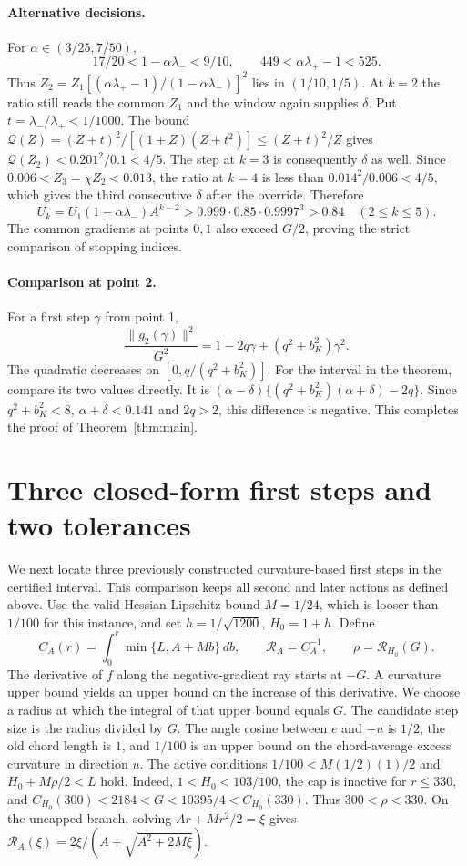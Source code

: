 \documentclass[11pt]{article}
\newcommand{\norm}[1]{\lVert#1\rVert}
\begin{document}
\paragraph{Alternative decisions.}
For \(\alpha\in(3/25,7/50)\),
\[
 17/20<1-\alpha\lambda_-<9/10,\qquad
 449<\alpha\lambda_+-1<525 .
\]
Thus \(Z_2=Z_1[(\alpha\lambda_+-1)/(1-\alpha\lambda_-)]^2\)
lies in \((1/10,1/5)\). At \(k=2\) the ratio still reads the
common \(Z_1\) and the window again supplies \(\delta\).
Put \(t=\lambda_-/\lambda_+<1/1000\). The bound
\(\mathcal Q(Z)=(Z+t)^2/[(1+Z)(Z+t^2)]\le (Z+t)^2/Z\)
gives \(\mathcal Q(Z_2)<0.201^2/0.1<4/5\).
The step at \(k=3\) is consequently \(\delta\) as well.
Since \(0.006<Z_3=\chi Z_2<0.013\), the ratio at \(k=4\) is
less than \(0.014^2/0.006<4/5\), which gives the third
consecutive \(\delta\) after the override. Therefore
\[
 U_k=U_1(1-\alpha\lambda_-)A^{k-2}
     >0.999\cdot0.85\cdot0.9997^3>0.84
       \quad (2\le k\le5).
\]
The common gradients at points \(0,1\) also exceed \(G/2\),
proving the strict comparison of stopping indices.

\paragraph{Comparison at point 2.}
For a first step \(\gamma\) from point 1,
\[
 \frac{\norm{g_2(\gamma)}^2}{G^2}
   =1-2q\gamma+(q^2+b_K^2)\gamma^2.
 \tag{3}\label{eq:norm}
\]
The quadratic decreases on \([0,q/(q^2+b_K^2)]\).
For the interval in the theorem, compare its two values directly.
It is \((\alpha-\delta)\{(q^2+b_K^2)(\alpha+\delta)-2q\}\).
Since \(q^2+b_K^2<8\), \(\alpha+\delta<0.141\) and \(2q>2\),
this difference is negative. This completes the proof of
Theorem~\ref{thm:main}.

\section{Three closed-form first steps and two tolerances}

We next locate three previously constructed curvature-based first
steps in the certified interval. This comparison keeps all second
and later actions as defined above. Use the valid Hessian Lipschitz bound \(M=1/24\), which is
looser than \(1/100\) for this instance, and set
\(h=1/\sqrt{1200}\), \(H_0=1+h\). Define
\[
 C_A(r)=\int_0^r\min\{L,A+Mb\}\,db,\qquad
 \mathcal R_A=C_A^{-1},\qquad \rho=\mathcal R_{H_0}(G).
\]
The derivative of \(f\) along the negative-gradient ray starts at
\(-G\). A curvature upper bound yields an upper bound on the increase
of this derivative. We choose a radius at which the integral of that
upper bound equals \(G\). The candidate step size is the radius divided
by \(G\).
The angle cosine between \(e\) and \(-u\) is \(1/2\), the old chord length is \(1\), and
\(1/100\) is an upper bound on the chord-average excess curvature
in direction \(u\). The active
conditions \(1/100<M(1/2)(1)/2\) and \(H_0+M\rho/2<L\) hold.
Indeed, \(1<H_0<103/100\), the cap is inactive for \(r\le330\),
and \(C_{H_0}(300)<2184<G<10395/4<C_{H_0}(330)\).
Thus \(300<\rho<330\). On the uncapped branch, solving
\(Ar+Mr^2/2=\xi\) gives
\(\mathcal R_A(\xi)=2\xi/(A+\sqrt{A^2+2M\xi})\).
\end{document}
